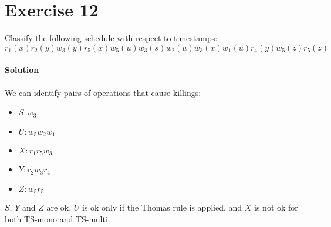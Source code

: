 \section{Exercise 12}

Classify the following schedule with respect to timestamps: 
\[r_1(x) r_2(y) w_3(y) r_5(x) w_5(u) w_3(s) w_2(u) w_3(x) w_1(u) r_4(y) w_5(z) r_5(z)\]

\paragraph*{Solution}
We can identify pairs of operations that cause killings:
\begin{itemize}
    \item $S:w_3$
    \item $U:w_5w_2w_1$
    \item $X:r_1r_5w_3$
    \item $Y:r_2w_3r_4$
    \item $Z:w_5r_5$
\end{itemize}
$S$, $Y$ and $Z$ are ok, $U$ is ok only if the Thomas rule is applied, and $X$ is not ok for both TS-mono and TS-multi. 